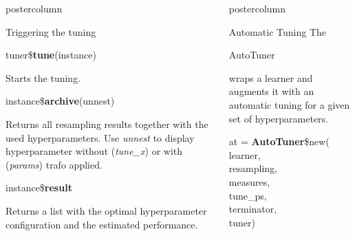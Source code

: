\documentclass{beamer}
\newlength{\columnheight} %
\newcommand{\codeinline}[1]{\begin{codeboxinline}#1\end{codeboxinline}}
\begin{document}
\begin{frame}[fragile]{}
\begin{columns}
\begin{column}{.245\textwidth}
\begin{beamercolorbox}[center]{postercolumn}
\begin{minipage}{.98\textwidth}
{\begin{myblock}{Triggering the tuning}
							\\
							\begin{codebox}
								tuner\$\textbf{tune}(instance)
							\end{codebox}
							Starts the tuning.
							\\
							\begin{codebox}
								instance\$\textbf{archive}(unnest)
							\end{codebox}
							Returns all resampling results together with the used hyperparameters. Use \textit{unnest} to display hyperparameter without (\textit{tune\_x}) or with (\textit{params}) trafo applied. 
							\\
							\begin{codebox}
								instance\$\textbf{result}
							\end{codebox}
							Returns a list with the optimal hyperparameter configuration and the estimated performance.
						\end{myblock}
					\vfill}
				\end{minipage}
			\end{beamercolorbox}
		\end{column}
		\begin{column}{.245\textwidth}
			\begin{beamercolorbox}[center]{postercolumn}
				\begin{minipage}{.98\textwidth}
					\parbox[t][\columnheight]{\textwidth}{
						\begin{myblock}{Automatic Tuning}
						The \codeinline{AutoTuner} wraps a learner and augments it with an automatic tuning for a given set of hyperparameters.
						\\
						\begin{codeboxmultiline}[width=18cm]
							at = \textbf{AutoTuner}\$new(
\\
							\hspace*{1ex}learner,
\\
							\hspace*{1ex}resampling,
\\
							\hspace*{1ex}measures,
\\
							\hspace*{1ex}tune\_ps,
\\
							\hspace*{1ex}terminator,
\\
							\hspace*{1ex}tuner)
						\end{codeboxmultiline}

\end{myblock}}
\end{minipage}
\end{beamercolorbox}
\end{column}
\end{columns}
\end{frame}
\end{document}
